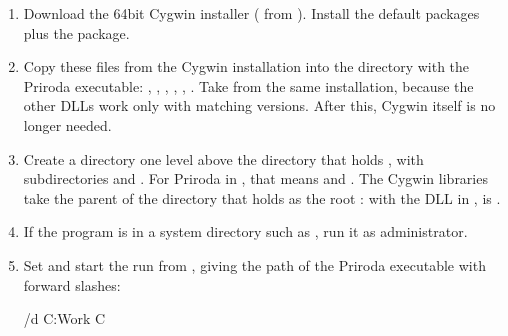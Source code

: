 \documentclass[letterpaper,10pt,english,openany,oneside]{sphinxmanual}
\begin{document}
\begin{enumerate}
%
\item {} 
\sphinxAtStartPar
Download the 64\sphinxhyphen{}bit Cygwin installer ( from ). Install the default packages
plus the  package.

\item {} 
\sphinxAtStartPar
Copy these files from the Cygwin installation into the directory with the Priroda executable:
, , , , , .
Take  from the same installation, because the other DLLs work only with matching versions.
After this, Cygwin itself is no longer needed.

\item {} 
\sphinxAtStartPar
Create a directory  one level above the directory that holds , with subdirectories  and
. For Priroda in , that means  and . The Cygwin libraries take the
parent of the directory that holds  as the root \sphinxcode{\sphinxupquote{/}}: with the DLL in ,  is
.

\item {} 
\sphinxAtStartPar
If the program is in a system directory such as , run it as administrator.

\item {} 
\sphinxAtStartPar
Set  and start the run from , giving the path of the Priroda executable with forward slashes:

\begin{sphinxVerbatim}[commandchars=\\\{\}]
 /d C:\PYGZbs{}Work
 
C
\end{sphinxVerbatim}

\end{enumerate}
\end{document}
